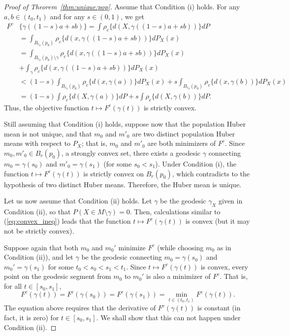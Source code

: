 \documentclass[preprint]{imsart}
\theoremstyle{plain}
\theoremstyle{remark}
\begin{document}
\begin{appendix}
\begin{proof}[Proof of Theorem~\ref{thm:unique:pop}]
Assume that Condition (i) holds. For any $a,b \in (t_0, t_1)$ and for any $s \in (0,1)$, we get
\begin{align}\label{eq:convex_ineq}
    F^c&\{\gamma((1-s)a + sb)\}  = \int \rho_c\{d(X, \gamma((1-s)a + sb))\} dP \nonumber \\ 
    & = \int_{B_{r_0}(p_0)} \rho_c\{d(x, \gamma((1-s)a + sb))\} dP_{X}(x) \nonumber \\
     & = \int_{B_{r_0}(p_0) \setminus \gamma} \rho_c\{d(x, \gamma((1-s)a + sb))\} dP_{X}(x) \nonumber \\ 
     & + \int_\gamma \rho_c\{d(x, \gamma((1-s)a + sb))\} dP_{X}(x) \nonumber \\
     & < (1-s) \int_{B_{r_0}(p_0)} \rho_c\{d(x, \gamma(a))\}dP_{X}(x) 
 +  s \int_{B_{r_0}(p_0)} \rho_c\{d(x, \gamma(b))\}dP_{X}(x) 
 \nonumber \\ 
     & =   (1-s) \int \rho_c\{d(X, \gamma(a))\}dP 
 +  s \int \rho_c\{d(X, \gamma(b))\}dP. 
\end{align}
Thus, the objective function $t \mapsto F^c(\gamma(t))$ is strictly convex.

Still assuming that Condition (i) holds, suppose now that the population Huber mean is not unique, and that $m_{0}$ and $m'_{0}$ are two distinct population Huber means with respect to $P_{X}$; that is, $m_{0}$ and $m'_{0}$ are both minimizers of $F^{c}$. Since $m_0, m'_0 \in B_{r}(p_0)$, a strongly convex set, there exists a geodesic $\gamma$ connecting $m_{0} = \gamma(s_0)$ and $m'_{0} = \gamma(s_1)$ (for some $s_0 < s_1$). 
Under Condition (i), the function $t\mapsto F^c(\gamma(t))$ is strictly convex on $B_{r}(p_0)$, which contradicts to the hypothesis of two distinct Huber means. Therefore, the Huber mean is unique. 
 
Let us now assume that Condition (ii) holds. Let $\gamma$ be the geodesic $\gamma_X$ given in Condition (ii), so that $P(X \in M\setminus \gamma) = 0.$ Then, calculations similar to (\ref{eq:convex_ineq}) leads that 
the function $t \mapsto F^c(\gamma(t))$ is convex (but it may not be strictly convex). 

Suppose again that both $m_0$ and $m_0'$ minimize $F^c$ (while choosing $m_0$ as in Condition (ii)), and let $\gamma$ be the geodesic connecting $m_0 = \gamma(s_0)$ and $m_0' = \gamma(s_1)$ for some $t_0 < s_0 < s_1 < t_1$.  Since $t \mapsto F^c(\gamma(t))$ is convex, every point on the geodesic segment from $m_0$ to $m_0'$ is also a minimizer of $F^c$. That is, for all $t \in [s_0,s_1]$, 
\begin{equation}
    \label{eq:everythingsminimizer}
    F^c(\gamma(t)) = F^c(\gamma(s_0)) = F^c(\gamma(s_1)) = \min_{t \in (t_0,t_1)} F^c(\gamma(t)).
\end{equation}
The equation above requires that the derivative of $F^c(\gamma(t))$ is constant (in fact, it is zero) for $t \in [s_0,s_1]$. We shall show that this can not happen under Condition (ii). 


\end{proof}
\end{appendix}
\end{document}
